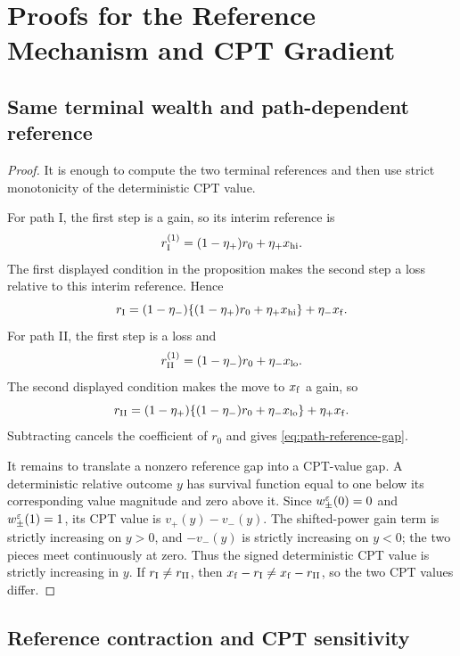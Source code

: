 \section{Proofs for the Reference Mechanism and CPT Gradient}\label{app:reference-gradient}

\subsection{Same terminal wealth and path-dependent reference}

\begin{proof}
It is enough to compute the two terminal references and then use strict monotonicity of the deterministic CPT value.

For path I, the first step is a gain, so its interim reference is
\[
 r_{\rm I}^{(1)}=(1-\eta_+)r_0+\eta_+x_{\rm hi}.
\]
The first displayed condition in the proposition makes the second step a loss relative to this interim reference.  Hence
\[
 r_{\rm I}=(1-\eta_-)\{(1-\eta_+)r_0+\eta_+x_{\rm hi}\}+\eta_-x_{\rm f}.
\]
For path II, the first step is a loss and
\[
 r_{\rm II}^{(1)}=(1-\eta_-)r_0+\eta_-x_{\rm lo}.
\]
The second displayed condition makes the move to $x_{\rm f}$ a gain, so
\[
 r_{\rm II}=(1-\eta_+)\{(1-\eta_-)r_0+\eta_-x_{\rm lo}\}+\eta_+x_{\rm f}.
\]
Subtracting cancels the coefficient of $r_0$ and gives \eqref{eq:path-reference-gap}.

It remains to translate a nonzero reference gap into a CPT-value gap.  A deterministic relative outcome $y$ has survival function equal to one below its corresponding value magnitude and zero above it.  Since $w_\pm^\varepsilon(0)=0$ and $w_\pm^\varepsilon(1)=1$, its CPT value is
$v_+(y)-v_-(y)$.  The shifted-power gain term is strictly increasing on $y>0$, and $-v_-(y)$ is strictly increasing on $y<0$; the two pieces meet continuously at zero.  Thus the signed deterministic CPT value is strictly increasing in $y$.  If $r_{\rm I}\ne r_{\rm II}$, then $x_{\rm f}-r_{\rm I}\ne x_{\rm f}-r_{\rm II}$, so the two CPT values differ.
\end{proof}

\subsection{Reference contraction and CPT sensitivity}

